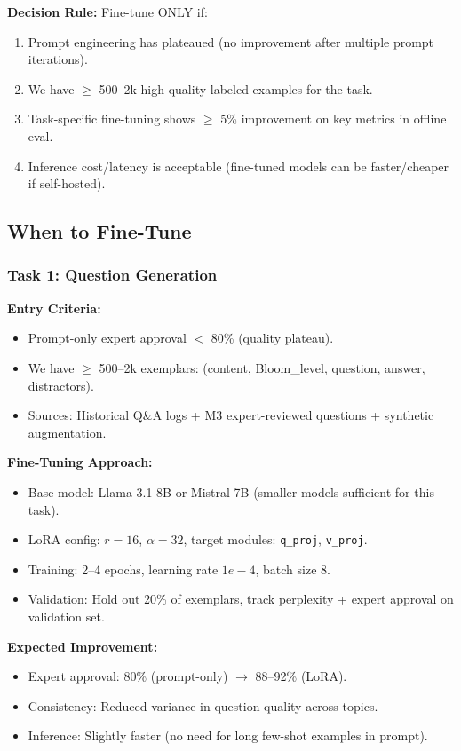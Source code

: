 \documentclass[11pt,letterpaper]{article}
\begin{document}
\textbf{Decision Rule:} Fine-tune ONLY if:
\begin{enumerate}
\item Prompt engineering has plateaued (no improvement after multiple prompt iterations).
\item We have $\geq$ 500--2k high-quality labeled examples for the task.
\item Task-specific fine-tuning shows $\geq$ 5\% improvement on key metrics in offline eval.
\item Inference cost/latency is acceptable (fine-tuned models can be faster/cheaper if self-hosted).
\end{enumerate}

\subsection{When to Fine-Tune}

\subsubsection{Task 1: Question Generation}

\textbf{Entry Criteria:}
\begin{itemize}
\item Prompt-only expert approval $<$ 80\% (quality plateau).
\item We have $\geq$ 500--2k exemplars: (content, Bloom\_level, question, answer, distractors).
\item Sources: Historical Q\&A logs + M3 expert-reviewed questions + synthetic augmentation.
\end{itemize}

\textbf{Fine-Tuning Approach:}
\begin{itemize}
\item Base model: Llama 3.1 8B or Mistral 7B (smaller models sufficient for this task).
\item LoRA config: $r=16$, $\alpha=32$, target modules: \texttt{q\_proj}, \texttt{v\_proj}.
\item Training: 2--4 epochs, learning rate $1e-4$, batch size 8.
\item Validation: Hold out 20\% of exemplars, track perplexity + expert approval on validation set.
\end{itemize}

\textbf{Expected Improvement:}
\begin{itemize}
\item Expert approval: 80\% (prompt-only) $\rightarrow$ 88--92\% (LoRA).
\item Consistency: Reduced variance in question quality across topics.
\item Inference: Slightly faster (no need for long few-shot examples in prompt).
\end{itemize}
\end{document}
